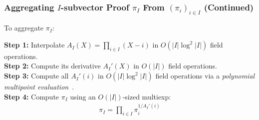 \begin{frame}
    \frametitle{Aggregating $I$-subvector Proof $\pi_I$ From $(\pi_i)_{i\in I}$ (Continued)}

    \pause
    To aggregate $\pi_I$:\pause

    \textbf{Step 1:} Interpolate $A_I(X)=\prod_{i\in I} (X-i)$ in $O(|I|\log^2{|I|})$ field operations.\pause\\
    \textbf{Step 2:} Compute its derivative $A_I'(X)$ in $O(|I|)$ field operations.\pause\\
    \textbf{Step 3:} Compute all $A_I'(i)$ in $O(|I|\log^2{|I|})$ field operations via a \textit{polynomial multipoint evaluation}~\cite{vG13ModernCh10}.\pause\\
    \textbf{Step 4:} Compute $\pi_I$ using an $O(|I|)$-sized multiexp:\pause
    \begin{align}
    \pi_I =\prod_{i\in I} \pi_i^{1/A_I'(i)}
    \end{align}
\end{frame}